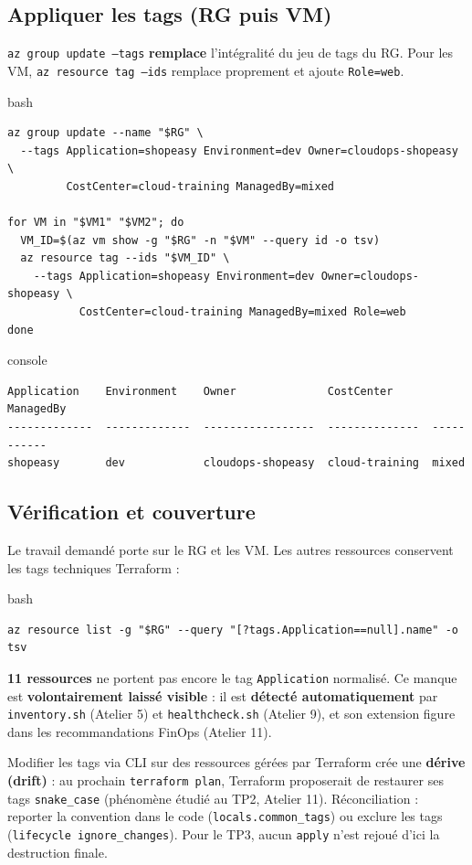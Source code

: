 \documentclass[11pt,a4paper]{article}
\newcommand{\code}[1]{\texttt{#1}}
\begin{document}
\subsection{Appliquer les tags (RG puis VM)}
\code{az group update --tags} \textbf{remplace} l'intégralité du jeu de tags du RG. Pour les VM, \code{az resource tag --ids} remplace proprement et ajoute \code{Role=web}.
\begin{codebox}{bash}
\begin{Verbatim}
az group update --name "$RG" \
  --tags Application=shopeasy Environment=dev Owner=cloudops-shopeasy \
         CostCenter=cloud-training ManagedBy=mixed

for VM in "$VM1" "$VM2"; do
  VM_ID=$(az vm show -g "$RG" -n "$VM" --query id -o tsv)
  az resource tag --ids "$VM_ID" \
    --tags Application=shopeasy Environment=dev Owner=cloudops-shopeasy \
           CostCenter=cloud-training ManagedBy=mixed Role=web
done
\end{Verbatim}
\end{codebox}
\begin{codebox}{console}
\begin{Verbatim}
Application    Environment    Owner              CostCenter      ManagedBy
-------------  -------------  -----------------  --------------  -----------
shopeasy       dev            cloudops-shopeasy  cloud-training  mixed
\end{Verbatim}
\end{codebox}

\subsection{Vérification et couverture}
Le travail demandé porte sur le RG et les VM. Les autres ressources conservent les tags techniques Terraform :
\begin{codebox}{bash}
\begin{Verbatim}
az resource list -g "$RG" --query "[?tags.Application==null].name" -o tsv
\end{Verbatim}
\end{codebox}
\textbf{11 ressources} ne portent pas encore le tag \code{Application} normalisé. Ce manque est \textbf{volontairement laissé visible} : il est \textbf{détecté automatiquement} par \code{inventory.sh} (Atelier 5) et \code{healthcheck.sh} (Atelier 9), et son extension figure dans les recommandations FinOps (Atelier 11).

\begin{notebox}[Drift Terraform]
Modifier les tags via CLI sur des ressources gérées par Terraform crée une \textbf{dérive (drift)} : au prochain \code{terraform plan}, Terraform proposerait de restaurer ses tags \code{snake\_case} (phénomène étudié au TP2, Atelier 11). Réconciliation : reporter la convention dans le code (\code{locals.common\_tags}) ou exclure les tags (\code{lifecycle ignore\_changes}). Pour le TP3, aucun \code{apply} n'est rejoué d'ici la destruction finale.
\end{notebox}
\end{document}
